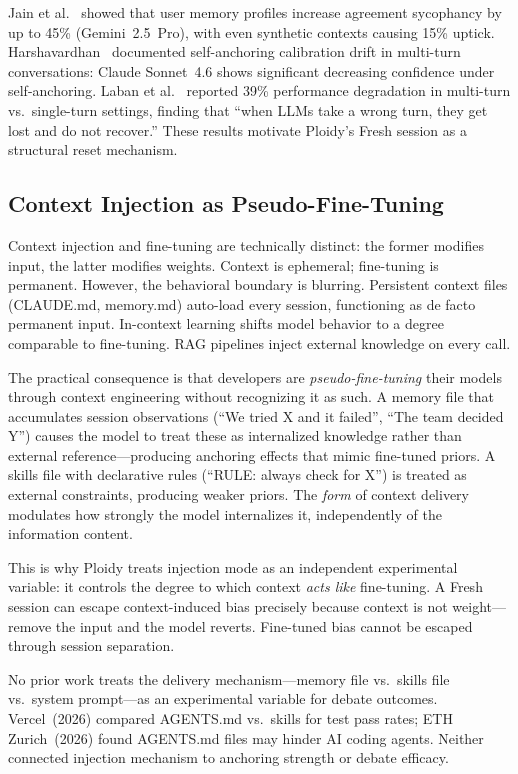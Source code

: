 \documentclass[11pt]{article}
\begin{document}
Jain et al.~\citep{jain2025sycophancy} showed that user memory profiles increase agreement sycophancy by up to 45\% (Gemini~2.5~Pro), with even synthetic contexts causing 15\% uptick. Harshavardhan~\citep{harshavardhan2026sacd} documented self-anchoring calibration drift in multi-turn conversations: Claude Sonnet~4.6 shows significant decreasing confidence under self-anchoring. Laban et al.~\citep{laban2025lost} reported 39\% performance degradation in multi-turn vs.\ single-turn settings, finding that ``when LLMs take a wrong turn, they get lost and do not recover.'' These results motivate Ploidy's Fresh session as a structural reset mechanism.

\subsection{Context Injection as Pseudo-Fine-Tuning}
\label{sec:injection-related}

Context injection and fine-tuning are technically distinct: the former modifies input, the latter modifies weights. Context is ephemeral; fine-tuning is permanent. However, the behavioral boundary is blurring. Persistent context files (CLAUDE.md, memory.md) auto-load every session, functioning as de facto permanent input. In-context learning shifts model behavior to a degree comparable to fine-tuning. RAG pipelines inject external knowledge on every call.

The practical consequence is that developers are \emph{pseudo-fine-tuning} their models through context engineering without recognizing it as such. A memory file that accumulates session observations (``We tried X and it failed'', ``The team decided Y'') causes the model to treat these as internalized knowledge rather than external reference---producing anchoring effects that mimic fine-tuned priors. A skills file with declarative rules (``RULE: always check for X'') is treated as external constraints, producing weaker priors. The \emph{form} of context delivery modulates how strongly the model internalizes it, independently of the information content.

This is why Ploidy treats injection mode as an independent experimental variable: it controls the degree to which context \emph{acts like} fine-tuning. A Fresh session can escape context-induced bias precisely because context is not weight---remove the input and the model reverts. Fine-tuned bias cannot be escaped through session separation.

No prior work treats the delivery mechanism---memory file vs.\ skills file vs.\ system prompt---as an experimental variable for debate outcomes. Vercel~(2026) compared AGENTS.md vs.\ skills for test pass rates; ETH Zurich~(2026) found AGENTS.md files may hinder AI coding agents. Neither connected injection mechanism to anchoring strength or debate efficacy.
\end{document}
